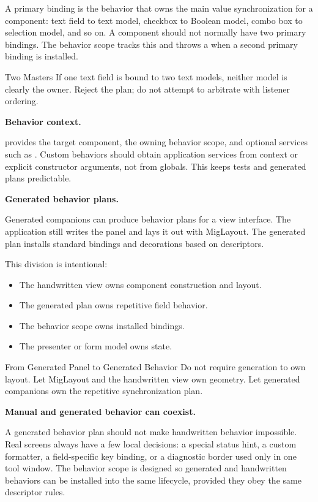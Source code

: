 A primary binding is the behavior that owns the main value synchronization for a
component: text field to text model, checkbox to Boolean model, combo box to
selection model, and so on. A component should not normally have two primary
bindings. The behavior scope tracks this and throws a
 when a second primary binding is installed.

\begin{pitfallbox}{Two Masters}
If one text field is bound to two text models, neither model is clearly the
owner. Reject the plan; do not attempt to arbitrate with listener ordering.
\end{pitfallbox}

\textbf{Behavior context.}

 provides the target component, the owning behavior scope,
and optional services such as . Custom behaviors should obtain
application services from context or explicit constructor arguments, not from
globals. This keeps tests and generated plans predictable.

\textbf{Generated behavior plans.}

Generated  companions can produce behavior plans for a view
interface. The application still writes the panel and lays it out with
MigLayout. The generated plan installs standard bindings and decorations based
on descriptors.

This division is intentional:

\begin{itemize}
\item The handwritten view owns component construction and layout.
\item The generated plan owns repetitive field behavior.
\item The behavior scope owns installed bindings.
\item The presenter or form model owns state.
\end{itemize}

\begin{migrationbox}{From Generated Panel to Generated Behavior}
Do not require generation to own layout. Let MigLayout and the handwritten view
own geometry. Let generated companions own the repetitive synchronization plan.
\end{migrationbox}

\textbf{Manual and generated behavior can coexist.}

A generated behavior plan should not make handwritten behavior impossible. Real
screens always have a few local decisions: a special status hint, a custom
formatter, a field-specific key binding, or a diagnostic border used only in one
tool window. The behavior scope is designed so generated and handwritten
behaviors can be installed into the same lifecycle, provided they obey the same
descriptor rules.

